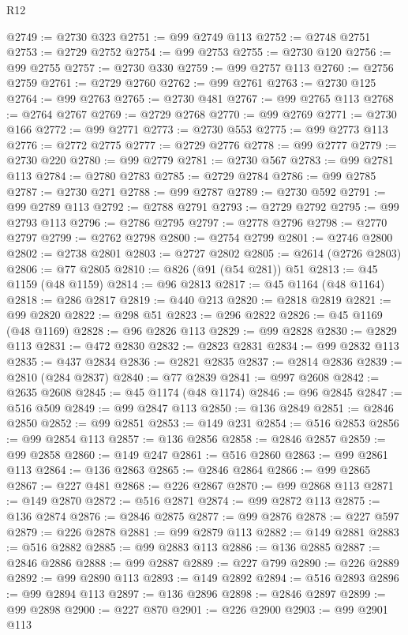 \begin{lexlean}{R12}
\begin{coremodule}
@2749 := @2730 @323
@2751 := @99 @2749 @113
@2752 := @2748 @2751
@2753 := @2729 @2752
@2754 := @99 @2753
@2755 := @2730 @120
@2756 := @99 @2755
@2757 := @2730 @330
@2759 := @99 @2757 @113
@2760 := @2756 @2759
@2761 := @2729 @2760
@2762 := @99 @2761
@2763 := @2730 @125
@2764 := @99 @2763
@2765 := @2730 @481
@2767 := @99 @2765 @113
@2768 := @2764 @2767
@2769 := @2729 @2768
@2770 := @99 @2769
@2771 := @2730 @166
@2772 := @99 @2771
@2773 := @2730 @553
@2775 := @99 @2773 @113
@2776 := @2772 @2775
@2777 := @2729 @2776
@2778 := @99 @2777
@2779 := @2730 @220
@2780 := @99 @2779
@2781 := @2730 @567
@2783 := @99 @2781 @113
@2784 := @2780 @2783
@2785 := @2729 @2784
@2786 := @99 @2785
@2787 := @2730 @271
@2788 := @99 @2787
@2789 := @2730 @592
@2791 := @99 @2789 @113
@2792 := @2788 @2791
@2793 := @2729 @2792
@2795 := @99 @2793 @113
@2796 := @2786 @2795
@2797 := @2778 @2796
@2798 := @2770 @2797
@2799 := @2762 @2798
@2800 := @2754 @2799
@2801 := @2746 @2800
@2802 := @2738 @2801
@2803 := @2727 @2802
@2805 := @2614 (@2726 @2803)
@2806 := @77 @2805
@2810 := @826 (@91 (@54 @281)) @51
@2813 := @45 @1159 (@48 @1159)
@2814 := @96 @2813
@2817 := @45 @1164 (@48 @1164)
@2818 := @286 @2817
@2819 := @440 @213
@2820 := @2818 @2819
@2821 := @99 @2820
@2822 := @298 @51
@2823 := @296 @2822
@2826 := @45 @1169 (@48 @1169)
@2828 := @96 @2826 @113
@2829 := @99 @2828
@2830 := @2829 @113
@2831 := @472 @2830
@2832 := @2823 @2831
@2834 := @99 @2832 @113
@2835 := @437 @2834
@2836 := @2821 @2835
@2837 := @2814 @2836
@2839 := @2810 (@284 @2837)
@2840 := @77 @2839
@2841 := @997 @2608
@2842 := @2635 @2608
@2845 := @45 @1174 (@48 @1174)
@2846 := @96 @2845
@2847 := @516 @509
@2849 := @99 @2847 @113
@2850 := @136 @2849
@2851 := @2846 @2850
@2852 := @99 @2851
@2853 := @149 @231
@2854 := @516 @2853
@2856 := @99 @2854 @113
@2857 := @136 @2856
@2858 := @2846 @2857
@2859 := @99 @2858
@2860 := @149 @247
@2861 := @516 @2860
@2863 := @99 @2861 @113
@2864 := @136 @2863
@2865 := @2846 @2864
@2866 := @99 @2865
@2867 := @227 @481
@2868 := @226 @2867
@2870 := @99 @2868 @113
@2871 := @149 @2870
@2872 := @516 @2871
@2874 := @99 @2872 @113
@2875 := @136 @2874
@2876 := @2846 @2875
@2877 := @99 @2876
@2878 := @227 @597
@2879 := @226 @2878
@2881 := @99 @2879 @113
@2882 := @149 @2881
@2883 := @516 @2882
@2885 := @99 @2883 @113
@2886 := @136 @2885
@2887 := @2846 @2886
@2888 := @99 @2887
@2889 := @227 @799
@2890 := @226 @2889
@2892 := @99 @2890 @113
@2893 := @149 @2892
@2894 := @516 @2893
@2896 := @99 @2894 @113
@2897 := @136 @2896
@2898 := @2846 @2897
@2899 := @99 @2898
@2900 := @227 @870
@2901 := @226 @2900
@2903 := @99 @2901 @113

\end{coremodule}
\end{lexlean}
